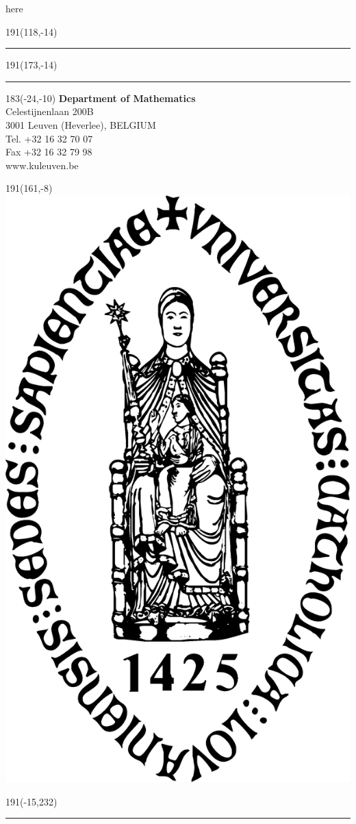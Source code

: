 \documentclass[
  12pt,
  a4paper,
  oneside]{book}
\begin{document}
here



\newpage
\backmatter
\thispagestyle{empty}
\sffamily
%
\begin{textblock}{191}(118,-14)
{\color{blueline}\rule{160pt}{5.5pt}}
\end{textblock}
%
\begin{textblock}{191}(173,-14)
{\color{blueline}\rule{5.5pt}{59pt}}
\end{textblock}
%
\begin{textblock}{183}(-24,-10)
\textblockcolour{}
\flushright
\fontsize{7}{7.5}\selectfont
\textbf{Department of Mathematics}\\
Celestijnenlaan 200B\\
3001 Leuven (Heverlee), BELGIUM\\
Tel. +32 16 32 70 07\\
Fax +32 16 32 79 98\\
www.kuleuven.be\\
\end{textblock}
%
\begin{textblock}{191}(161,-8)
\textblockcolour{}
\includegraphics*[height=16.5truemm]{Images/sedes}
\end{textblock}
%
\begin{textblock}{191}(-15,232)
{\color{bluetitle}\rule{544pt}{55pt}}
\end{textblock}
\end{document}
